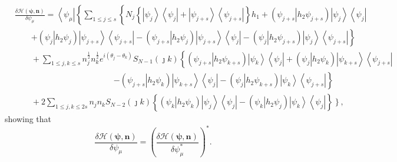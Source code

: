 \documentclass[aps,preprint]{revtex4}%
\begin{document}
\begin{align}
&  \frac{\delta\mathcal{H}\left(  \mathbf{\psi,n}\right)  }{\delta\psi_{\mu}%
}=\left\langle \psi_{\mu}\right\vert \left\{  \sum_{1\leq j\leq s}\left\{
N_{j}\left\{  \left\vert \psi_{j}\right\rangle \left\langle \psi
_{j}\right\vert +\left\vert \psi_{j+s}\right\rangle \left\langle \psi
_{j+s}\right\vert \right\}  h_{1}+\left(  \left.  \psi_{j+s}\right\vert
h_{2}\psi_{j+s}\right)  \left\vert \psi_{j}\right\rangle \left\langle \psi
_{j}\right\vert \right.  \right. \nonumber\\
&  \qquad\left.  +\left(  \left.  \psi_{j}\right\vert h_{2}\psi_{j}\right)
\left\vert \psi_{j+s}\right\rangle \left\langle \psi_{j+s}\right\vert -\left(
\left.  \psi_{j+s}\right\vert h_{2}\psi_{j}\right)  \left\vert \psi
_{j+s}\right\rangle \left\langle \psi_{j}\right\vert -\left(  \left.  \psi
_{j}\right\vert h_{2}\psi_{j+s}\right)  \left\vert \psi_{j}\right\rangle
\left\langle \psi_{j+s}\right\vert \right\} \nonumber\\
&  \qquad+\sum_{1\leq j,k\leq s}n_{j}^{\frac{1}{2}}n_{k}^{\frac{1}{2}%
}e^{i\left(  \theta_{j}-\theta_{k}\right)  }S_{N-1}\left(  \jmath k\right)
\left\{  \left(  \left.  \psi_{j+s}\right\vert h_{2}\psi_{k+s}\right)
\left\vert \psi_{k}\right\rangle \left\langle \psi_{j}\right\vert +\left(
\left.  \psi_{j}\right\vert h_{2}\psi_{k}\right)  \left\vert \psi
_{k+s}\right\rangle \left\langle \psi_{j+s}\right\vert \right. \nonumber\\
&  \qquad\qquad\qquad\qquad\qquad\qquad\left.  -\left(  \left.  \psi
_{j+s}\right\vert h_{2}\psi_{k}\right)  \left\vert \psi_{k+s}\right\rangle
\left\langle \psi_{j}\right\vert -\left(  \left.  \psi_{j}\right\vert
h_{2}\psi_{k+s}\right)  \left\vert \psi_{k}\right\rangle \left\langle
\psi_{j+s}\right\vert \right\} \nonumber\\
&  \qquad+2\sum_{1\leq j,k\leq2s}n_{j}n_{k}S_{N-2}\left(  \jmath k\right)
\left\{  \left(  \left.  \psi_{k}\right\vert h_{2}\psi_{k}\right)  \left\vert
\psi_{j}\right\rangle \left\langle \psi_{j}\right\vert -\left(  \left.
\psi_{k}\right\vert h_{2}\psi_{j}\right)  \left\vert \psi_{k}\right\rangle
\left\langle \psi_{j}\right\vert \right\}  \left.  \overset{}{}\right\}  ,
\label{der2}%
\end{align}
showing that
\begin{equation}
\frac{\delta\mathcal{H}\left(  \mathbf{\psi,n}\right)  }{\delta\psi_{\mu}%
}=\left(  \frac{\delta\mathcal{H}\left(  \mathbf{\psi,n}\right)  }{\delta
\psi_{\mu}^{\ast}}\right)  ^{\ast}.
\end{equation}
\end{document}
